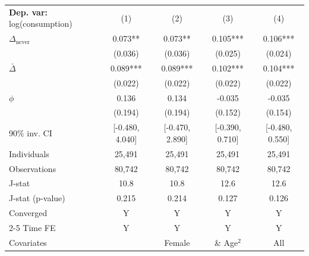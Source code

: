 \begin{tabular}{l cccc} \toprule  \textbf{Dep. var:}  log(consumption) 
                    &\multicolumn{1}{c}{(1)}   &\multicolumn{1}{c}{(2)}   &\multicolumn{1}{c}{(3)}   &\multicolumn{1}{c}{(4)}   \\

\addlinespace
$\Delta_{\text{never}}$&       0.073** &       0.073** &       0.105***&       0.106***\\
                    &     (0.036)   &     (0.036)   &     (0.025)   &     (0.024)   \\

\addlinespace
$\bar{\Delta}$      &       0.089***&       0.089***&       0.102***&       0.104***\\
                    &     (0.022)   &     (0.022)   &     (0.022)   &     (0.022)   \\

\addlinespace
$\phi$              &       0.136   &       0.134   &      -0.035   &      -0.035   \\
                    &     (0.194)   &     (0.194)   &     (0.152)   &     (0.154)   \\
90\% inv. CI        &[-0.480, 4.040]   &[-0.470, 2.890]   &[-0.390, 0.710]   &[-0.480, 0.550]   \\
Individuals         &      25,491   &      25,491   &      25,491   &      25,491   \\
Observations        &      80,742   &      80,742   &      80,742   &      80,742   \\
J-stat              &        10.8   &        10.8   &        12.6   &        12.6   \\
J-stat (p-value)    &       0.215   &       0.214   &       0.127   &       0.126   \\
Converged           &           Y   &           Y   &           Y   &           Y   \\
\cmidrule{2-5} Time FE & Y & Y & Y & Y \\ Covariates & & Female & \& Age$^2$ & All \\ \bottomrule \end{tabular}
